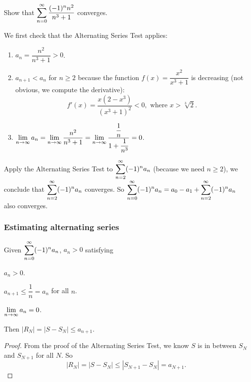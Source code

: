 \begin{ex}
    Show that $\displaystyle\sum_{n=0}^\infty \dfrac{(-1)^n n^2}{n^3+1}$ converges.
    
    We first check that the Alternating Series Test applies: 
    \begin{enumerate}[label = \circled{\arabic*}]
        \item $a_n = \dfrac{n^2}{n^3+1} > 0$.
        
        \item $a_{n+1} < a_n$ for $n \geq 2$ because the function $f(x) = \dfrac{x^2}{x^3+1}$ is decreasing (not obvious, we compute the derivative):
        \[f'(x) = \dfrac{x(2-x^3)}{(x^3+1)^2} < 0, \text{ where } x > \sqrt[3]{2}.\]
        
        \item $\displaystyle\lim_{n \to \infty} a_n = \displaystyle\lim_{n \to \infty} \dfrac{n^2}{n^3+1} = \displaystyle\lim_{n \to \infty} \dfrac{\dfrac{1}{n}}{1+\dfrac{1}{n^3}} = 0$.
    \end{enumerate}
    Apply the Alternating Series Test to $\displaystyle\sum_{n=2}^\infty (-1)^n a_n$ (because we need $n\geq 2$), we conclude that $\displaystyle\sum_{n=2}^\infty (-1)^n a_n$ converges. So $\displaystyle\sum_{n=0}^\infty (-1)^n a_n = a_0 - a_1 + \displaystyle\sum_{n=2}^\infty (-1)^n a_n$ also converges.
\end{ex}

\subsubsection{Estimating alternating series}
\begin{thm}
    Given $\displaystyle\sum_{n=0}^\infty (-1)^n a_n$, $a_n > 0$ satisfying 
    \begin{center}
    \begin{enumerate*}[label = \circled{\arabic*}]
        \item $a_n > 0$.
        \item $a_{n+1} \leq \dfrac{1}{n} = a_n$ for all $n$.
        \item $\displaystyle\lim_{n \to \infty} a_n = 0$.
    \end{enumerate*}
    \end{center}
    Then $|R_N| = |S - S_N| \leq a_{n+1}$.
\end{thm}

\begin{proof}
    From the proof of the Alternating Series Test, we know $S$ is in between $S_N$ and $S_{N+1}$ for all $N$. So 
    \[|R_N| = |S - S_N| \leq |S_{N+1} - S_N| = a_{N+1}.\]
\end{proof}


